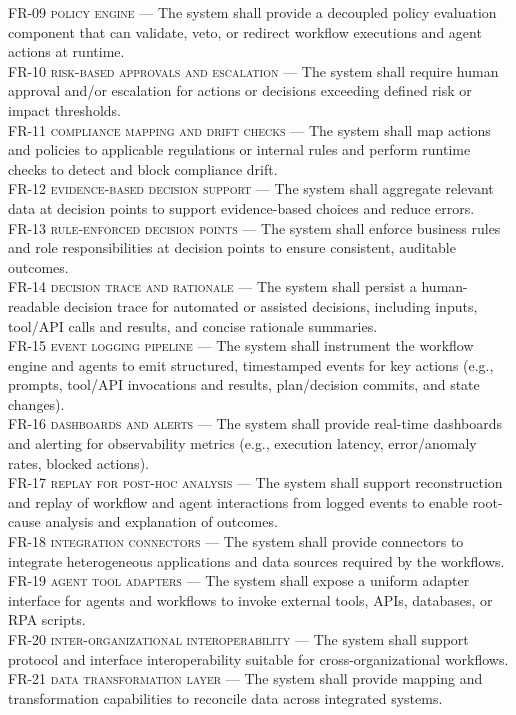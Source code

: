 \begin{footnotesize}
\noindent \textsc{FR-09 policy engine} --- The system shall provide a decoupled policy evaluation component that can validate, veto, or redirect workflow executions and agent actions at runtime. \\
\noindent \textsc{FR-10 risk-based approvals and escalation} --- The system shall require human approval and/or escalation for actions or decisions exceeding defined risk or impact thresholds. \\
\noindent \textsc{FR-11 compliance mapping and drift checks} --- The system shall map actions and policies to applicable regulations or internal rules and perform runtime checks to detect and block compliance drift. \\
\noindent \textsc{FR-12 evidence-based decision support} --- The system shall aggregate relevant data at decision points to support evidence-based choices and reduce errors. \\
\noindent \textsc{FR-13 rule-enforced decision points} --- The system shall enforce business rules and role responsibilities at decision points to ensure consistent, auditable outcomes. \\
\noindent \textsc{FR-14 decision trace and rationale} --- The system shall persist a human-readable decision trace for automated or assisted decisions, including inputs, tool/API calls and results, and concise rationale summaries. \\
\noindent \textsc{FR-15 event logging pipeline} --- The system shall instrument the workflow engine and agents to emit structured, timestamped events for key actions (e.g., prompts, tool/API invocations and results, plan/decision commits, and state changes). \\
\noindent \textsc{FR-16 dashboards and alerts} --- The system shall provide real-time dashboards and alerting for observability metrics (e.g., execution latency, error/anomaly rates, blocked actions). \\
\noindent \textsc{FR-17 replay for post-hoc analysis} --- The system shall support reconstruction and replay of workflow and agent interactions from logged events to enable root-cause analysis and explanation of outcomes. \\
\noindent \textsc{FR-18 integration connectors} --- The system shall provide connectors to integrate heterogeneous applications and data sources required by the workflows. \\
\noindent \textsc{FR-19 agent tool adapters} --- The system shall expose a uniform adapter interface for agents and workflows to invoke external tools, APIs, databases, or RPA scripts. \\
\noindent \textsc{FR-20 inter-organizational interoperability} --- The system shall support protocol and interface interoperability suitable for cross-organizational workflows. \\
\noindent \textsc{FR-21 data transformation layer} --- The system shall provide mapping and transformation capabilities to reconcile data across integrated systems. \\
\end{footnotesize}

